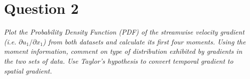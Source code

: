 \section*{Question 2}

\textit{ Plot the Probability Density Function (PDF) of the streamwise velocity gradient (i.e. $\partial u_1 / \partial x_1$) from both datasets and calculate its first four moments. Using the moment information, comment on type of distribution exhibited by gradients in the two sets of data. Use Taylor’s hypothesis to convert temporal gradient to spatial gradient.}

